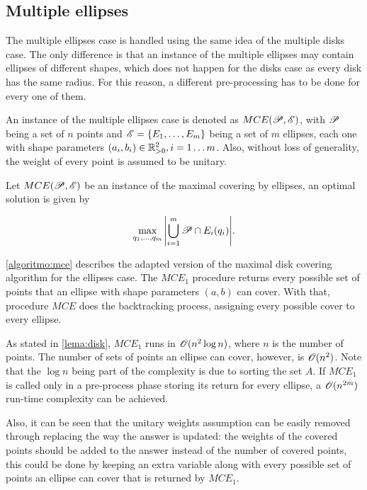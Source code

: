 \subsection{Multiple ellipses}

The multiple ellipses case is handled using the same idea of the multiple disks case. The only difference is that an instance of the multiple ellipses may contain ellipses of different shapes, which does not happen for the disks case as every disk has the same radius. For this reason, a different pre-processing has to be done for every one of them.

An instance of the multiple ellipses case is denoted as $MCE(\mathscr{P}, \mathscr{E})$, with $\mathscr{P}$ being a set of $n$ points and $\mathscr{E} = \{E_1, \dots, E_m\}$ being a set of $m$ ellipses, each one with shape parameters $(a_i, b_i) \in \mathbb{R}^2_{>0}, i = 1 \dots m$. Also, without loss of generality, the weight of every point is assumed to be unitary.

\begin{definicao}
Let $MCE(\mathscr{P}, \mathscr{E})$ be an instance of the maximal covering by ellipses, an optimal solution is given by

\begin{equation}
    \max_{q_1, \dots, q_m}{\left|\bigcup_{i=1}^{m} \mathscr{P} \cap E_i(q_i)\right|}.
\end{equation}
\end{definicao}

\autoref{algoritmo:mce} describes the adapted version of the maximal disk covering algorithm for the ellipses case. The $MCE_1$ procedure returns every possible set of points that an ellipse with shape parameters $(a,b)$ can cover. With that, procedure $MCE$ does the backtracking process, assigning every possible cover to every ellipse.

As stated in \autoref{lema:disk}, $MCE_1$ runs in $\mathscr{O}(n^2\log{n})$, where $n$ is the number of points. The number of sets of points an ellipse can cover, however, is $\mathscr{O}(n^2)$. Note that the $\log{n}$ being part of the complexity is due to sorting the set $A$. If $MCE_1$ is called only in a pre-process phase storing its return for every ellipse, a $\mathscr{O}(n^{2m})$ run-time complexity can be achieved. 

Also, it can be seen that the unitary weights assumption can be easily removed through replacing the way the answer is updated: 
the weights of the covered points should be added to the answer instead of the number of covered points, this could be done by keeping an extra variable along with every possible set of points an ellipse can cover that is returned by $MCE_1$.

